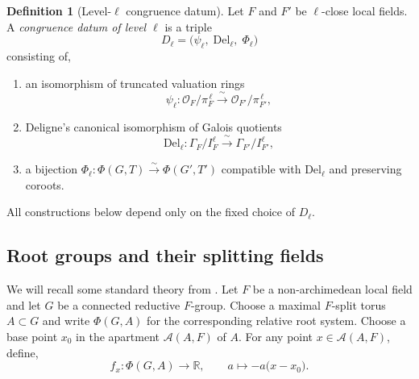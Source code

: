 \documentclass[american]{article}
\numberwithin{equation}{section}
\numberwithin{figure}{section}
\theoremstyle{plain}
\theoremstyle{definition}
\newtheorem{definition}[theorem]{Definition}
\theoremstyle{remark}
\newcommand{\Del}{\mathrm{Del}}
\begin{document}
\begin{definition}[Level-$\ell$ congruence datum]
\label{def:congruence-datum}
Let $F$ and $F'$ be $\ell$-close local fields. A \emph{congruence datum of level $\ell$} is a triple
\[
  D_\ell = \bigl( \psi_\ell,\; \Del_\ell,\; \Phi_\ell \bigr)
\]
consisting of,
\begin{enumerate}
\item an isomorphism of truncated valuation rings
\[
  \psi_\ell: \mathcal{O}_F/\pi_F^{\,\ell} \xrightarrow{\;\sim\;} \mathcal{O}_{F'}/\pi_{F'}^{\,\ell},
\]
\item Deligne's canonical isomorphism of Galois quotients
\[
  \Del_\ell: \Gamma_F/I_F^{\ell} \xrightarrow{\;\sim\;} \Gamma_{F'}/I_{F'}^{\ell},
\]
\item a bijection $\Phi_\ell:\Phi(G,T)\xrightarrow{\sim}\Phi(G',T')$ compatible with $\Del_\ell$ and preserving coroots.
\end{enumerate}
All constructions below depend only on the fixed choice of $D_\ell$.
\end{definition}
\subsection{Root groups and their splitting fields}\label{subsec:root-splitting-field}
We will recall some standard theory from \cite{BT84}.
Let \(F\) be a non-archimedean local field and let \(G\) be a connected
reductive \(F\)-group.  
Choose a maximal \(F\)-split torus \(A\subset G\) and write
\(\Phi(G,A)\) for the corresponding relative root system. Choose a base point $x_{0}$ in the apartment $\mathcal{A}(A,F)$ of ${A}$. For any point $x\in\mathcal{A}(A,F)$, define,
\[
  f_{x} : \Phi(G,A)\longrightarrow\mathbb{R}, \qquad a\longmapsto -a\bigl(x-x_{0}\bigr).
\]
\end{document}
